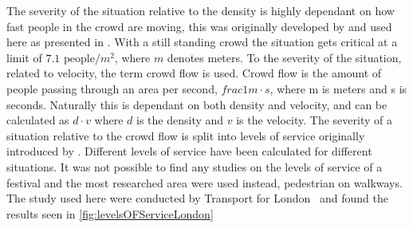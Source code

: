 The severity of the situation relative to the density is highly dependant on how fast people in the crowd are moving, this was originally developed by \citet{crowdDistasters} and used here as presented in \citet{wirz2013probing}. With a still standing crowd the situation gets critical at a limit of $7.1 \text{ people} / m^2$, where $m$ denotes meters. To  the severity of the situation, related to velocity, the term crowd flow is used. Crowd flow is the amount of people passing through an area per second, $frac{1}{m \cdot s}$, where m is meters and s is seconds. Naturally this is dependant on both density and velocity, and can be calculated as ${d} \cdot {v}$ where $d$ is the density and $v$ is the velocity. The severity of a situation relative to the crowd flow is split into levels of service originally introduced by . Different levels of service have been calculated for different situations. It was not possible to find any studies on the levels of service of a festival and the most researched area were used instead, pedestrian on walkways. The study used here were conducted by Transport for London~\cite{levelsOfServiceLondon} and found the results seen in \cref{fig:levelsOFServiceLondon}

